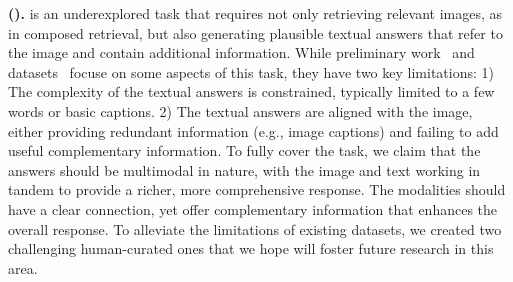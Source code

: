 \noindent\textbf{\tasknametitle (\tasknameshort).}
\tasknameshort is an underexplored task that requires not only retrieving relevant images, as in composed retrieval, but also generating plausible textual answers that refer to the image and contain additional information.
While preliminary work~\cite{wei2023uniir, jiang2024vlm2vec, qi2024roravlm, karthik2023vision} and datasets~\cite{hu2023open, chen2023can, mensink2023encyclopedic} focuse on some aspects of this task, they have two key limitations: 
1) The complexity of the textual answers is constrained, typically limited to a few words or basic captions.
2) The textual answers are aligned with the image, either providing redundant information (e.g., image captions) and failing to add useful complementary information.
To fully cover the \tasknameshort task, we claim that the answers should be multimodal in nature, with the image and text working in tandem to provide a richer, more comprehensive response.
The modalities should have a clear connection, yet offer complementary information that enhances the overall response.
To alleviate the limitations of existing \tasknameshort datasets, we created two challenging human-curated ones that we hope will foster future research in this area.